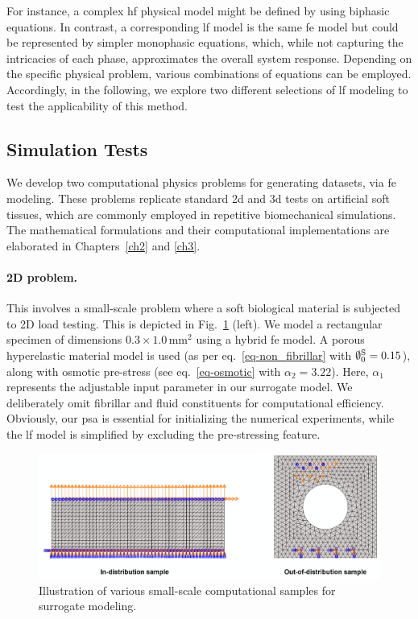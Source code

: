 For instance, a complex \ac{hf} physical model might be defined by using biphasic equations. In contrast, a corresponding \ac{lf} model is the same \ac{fe} model but could be represented by simpler monophasic equations, which, while not capturing the intricacies of each phase, approximates the overall system response. Depending on the specific physical problem, various combinations of equations can be employed. Accordingly, in the following, we explore two different selections of \ac{lf} modeling to test the applicability of this method.

\subsection{Simulation Tests}

We develop two computational physics problems for generating datasets, via \ac{fe} modeling. These problems replicate standard \ac{2d} and \ac{3d} tests on artificial soft tissues, which are commonly employed in repetitive biomechanical simulations. The mathematical formulations and their computational implementations are elaborated in Chapters~\ref{ch2} and \ref{ch3}.

\paragraph{2D problem.} This involves a small-scale problem where a soft biological material is subjected to 2D load testing. This is depicted in Fig.~\ref{fig:2d_model} (left). We model a rectangular specimen of dimensions $0.3 \times 1.0$\,mm$^2$ using a hybrid \ac{fe} model. A porous hyperelastic material model is used (as per eq.~\ref{eq-non_fibrillar} with $\emptyset_0^{\rm S}=0.15$), along with osmotic pre-stress (see eq.~\ref{eq-osmotic} with $\alpha_2 = 3.22$). Here, $\alpha_1$ represents the adjustable input parameter in our surrogate model. We deliberately omit fibrillar and fluid constituents for computational efficiency. Obviously, our \ac{psa} is essential for initializing the numerical experiments, while the \ac{lf} model is simplified by excluding the pre-stressing feature.
%
\begin{figure}\centering
\includegraphics[width=\linewidth]{2d_model.pdf}
\caption{Illustration of various small-scale computational samples for surrogate modeling.\label{fig:2d_model}}
\end{figure}

